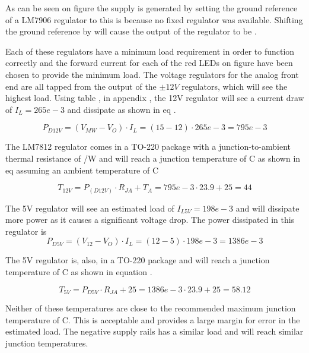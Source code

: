As can be seen on figure  the  supply is generated by setting the ground reference of a LM7906  regulator to  this is because no fixed  regulator was available. Shifting the ground reference by  will cause the output of the  regulator to be .

Each of these regulators have a minimum load requirement in order to function correctly and the forward current for each of the red LEDs on figure  have been chosen to provide the minimum load. The voltage regulators for the analog front end are all tapped from the output of the $\pm 12V$ regulators, which will see the highest load. Using table , in appendix , the 12V regulator will see a current draw of $I_L = 265e-3$ and dissipate  as shown in eq .

\begin{equation}\label{eq:7_1_6_PD12}
    P_{D12V} = (V_{MW} - V_O) \cdot I_L = (15 - 12)\cdot 265e-3 = 795e-3
\end{equation}

The LM7812 regulator comes in a TO-220 package with a junction-to-ambient thermal resistance of /W and will reach a junction temperature of C as shown in eq  assuming an ambient temperature of C

\begin{equation}\label{eq:7_1_6_T12V}
    T_{12V} = P_(D12V) \cdot R_{JA} + T_A = 795e-3 \cdot 23.9 + 25 = 44
\end{equation}

The 5V regulator will see an estimated load of $I_{L5V} = 198e-3$ and will dissipate more power as it causes a significant voltage drop. The power dissipated in this regulator is 
\begin{equation}\label{eq:7_1_6_PD5V}
    P_{D5V} = (V_{12} - V_O) \cdot I_L = (12 - 5)\cdot 198e-3 = 1386e-3
\end{equation}

The 5V regulator is, also, in a TO-220 package and will reach a junction temperature of C as shown in equation .

\begin{equation}\label{eq:7_1_6_T5V}
    T_{5V} = P_{D5V} \cdot  R_{JA} + 25 = 1386e-3 \cdot 23.9 + 25  = 58.12
\end{equation}

Neither of these temperatures are close to the recommended maximum junction temperature of C. This is acceptable and provides a large margin for error in the estimated load. The negative supply rails has a similar load and will reach similar junction temperatures.


